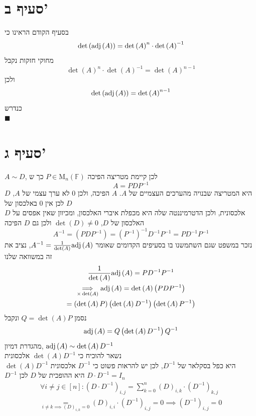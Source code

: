 \documentclass[12pt, titlepage]{article}
\begin{document}
\section*{סעיף ב'}
בסעיף הקודם הראינו כי
\[
    \det\left(\mathrm{adj}\left(A\right)\right)  =\det\left(A\right)^{n} \cdot \det\left(A\right)^{-1}
\]
מחוקי חזקות נקבל
\[
    \det\left(A\right)^n  \cdot \det\left(A\right)^{-1}=\det\left(A\right)^{n-1}
\]
ולכן
\[
    \det\left(\mathrm{adj}\left(A\right)\right) = \det\left(A\right)^{n-1}
\]
כנדרש \\
$\blacksquare$
\section*{סעיף ג'}
$A \sim D$, לכן קיימת מטריצה הפיכה $P\in\mathrm{M}_n\left(\mathbb{F}\right)$ כך ש
\[
    A=PDP^{-1}
\]
$D$ היא המטריצה שבנויה מהערכים העצמיים של $A$. $A$ הפיכה, ולכן $0$ לא ערך עצמי של $A$, לכן אין $0$ באלכסון של $D$\\
$D$ אלכסונית, ולכן הדטרמיננטה שלה היא מכפלת איברי האלכסון, ומכיוון שאין אפסים על האלכסון של $D$, $\det\left(D\right)\neq 0$ ולכן גם $D$ הפיכה
\[
A^{-1} = \left(PDP^{-1}\right) = \left(P^{-1}\right)^{-1} D^{-1} P^{-1} = PD^{-1}P^{-1}
\]
נזכר במשפט שגם השתמשנו בו בסעיפים הקדומים שאומר $A^{-1}=\frac{1}{\det\left(A\right)}\mathrm{adj}\left(A\right)$, נציב את זה במשוואה שלנו
\begin{gather*}
\frac{1}{\det\left(A\right)} \mathrm{adj}\left(A\right) = PD^{-1}P^{-1} \\
\underset{\times \det\left(A\right)}{\implies} \mathrm{adj}\left(A\right)= \det\left(A\right)\left(PDP^{-1}\right)\\
=\left(\det\left(A\right) P\right) \left(\det\left(A\right)D^{-1}\right) \left(\det\left(A\right)P^{-1}\right)
\end{gather*}
נסמן $Q=\det\left(A\right)P$ ונקבל
\[
\mathrm{adj}\left(A\right) = Q\left(\det\left(A\right)D^{-1}\right)Q^{-1}
\]
מהגדרת דמיון, $\mathrm{adj}\left(A\right)\sim \det\left(A\right) D^{-1}$\\
נשאר להוכיח כי $\det\left(A\right)D^{-1}$ אלכסונית \\
$\det\left(A\right)D^{-1}$ היא כפל בסקלאר של $D^{-1}$, לכן יש להראות פשוט כי $D^{-1}$ אלכסונית  \\
$D^{-1}$ היא ההופכית של $D$ לכן $D\cdot D^{-1}=I_n$ 
\begin{gather*}
    \forall i\neq j \in \left[n\right]: \left(D\cdot D^{-1}\right)_{i,j} = \sum_{k=0}^{n} \left(D\right)_{i,k} \cdot \left(D^{-1}\right)_{k,j} \\ \underset{i\neq k\implies \left(D\right)_{i,k}=0}{=} \left(D\right)_{i,i} \cdot \left(D^{-1}\right)_{i,j} = 0 \implies \left(D^{-1}\right)_{i,j} = 0
\end{gather*}
\end{document}
